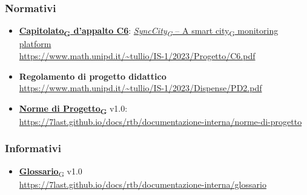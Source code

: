 \subsubsection{Normativi}
\begin{itemize}
	\item \href{https://7last.github.io/docs/rtb/documentazione-interna/glossario\#capitolato}{\textbf{Capitolato\textsubscript{G} d'appalto C6}}: \href{https://7last.github.io/docs/rtb/documentazione-interna/glossario\#synccity}{\textit{SyncCity\textsubscript{G} } – A \href{https://7last.github.io/docs/rtb/documentazione-interna/glossario\#smart-city}{smart city\textsubscript{G}} monitoring platform}\\
	      \url{https://www.math.unipd.it/~tullio/IS-1/2023/Progetto/C6.pdf}
	\item \textbf{Regolamento di progetto didattico}\\
	      \url{https://www.math.unipd.it/~tullio/IS-1/2023/Dispense/PD2.pdf}
	\item \href{https://7last.github.io/docs/rtb/documentazione-interna/glossario\#norme-di-progetto}{\textbf{Norme di Progetto\textsubscript{G}}} v1.0:\\
	\url{https://7last.github.io/docs/rtb/documentazione-interna/norme-di-progetto}
\end{itemize}
\subsubsection{Informativi}
\begin{itemize}
	\item \href{https://7last.github.io/docs/rtb/documentazione-interna/glossario\#glossario}{\textbf{Glossario}\textsubscript{G}} v1.0\\
	\url{https://7last.github.io/docs/rtb/documentazione-interna/glossario}
\end{itemize}
\newpage
